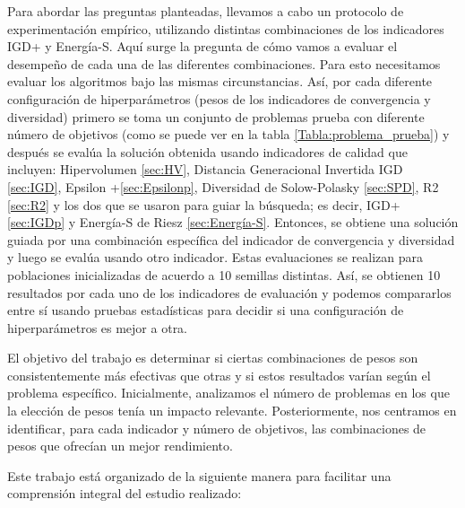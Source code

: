 Para abordar las preguntas planteadas, llevamos a cabo un protocolo de experimentación empírico, utilizando distintas combinaciones de los indicadores IGD+ y Energía-S. Aquí surge la pregunta de cómo vamos a evaluar el desempeño de cada una de las diferentes combinaciones. Para esto necesitamos evaluar los algoritmos bajo las mismas circunstancias. Así, por cada diferente configuración de hiperparámetros (pesos de los indicadores de convergencia y diversidad) primero se toma un conjunto de problemas prueba con diferente número de objetivos (como se puede ver en la tabla \ref{Tabla:problema_prueba}) y después se evalúa la solución obtenida usando indicadores de calidad que incluyen: Hipervolumen \ref{sec:HV}, Distancia Generacional Invertida IGD \ref{sec:IGD}, Epsilon +\ref{sec:Epsilonp}, Diversidad de Solow-Polasky \ref{sec:SPD}, R2 \ref{sec:R2} y los dos que se usaron para guiar la búsqueda; es decir, IGD+ \ref{sec:IGDp} y Energía-S de Riesz \ref{sec:Energía-S}. Entonces, se obtiene una solución guiada por una combinación específica del indicador de convergencia y diversidad y luego se evalúa usando otro indicador. Estas evaluaciones se realizan para poblaciones inicializadas de acuerdo a 10 semillas distintas. Así, se obtienen 10 resultados por cada uno de los indicadores de evaluación y podemos compararlos entre sí usando pruebas estadísticas para decidir si una configuración de hiperparámetros es mejor a otra.

El objetivo del trabajo es determinar si ciertas combinaciones de pesos son consistentemente más efectivas que otras y si estos resultados varían según el problema específico. Inicialmente, analizamos el número de problemas en los que la elección de pesos tenía un impacto relevante. Posteriormente, nos centramos en identificar, para cada indicador y número de objetivos, las combinaciones de pesos que ofrecían un mejor rendimiento.

Este trabajo está organizado de la siguiente manera para facilitar una comprensión integral del estudio realizado:

